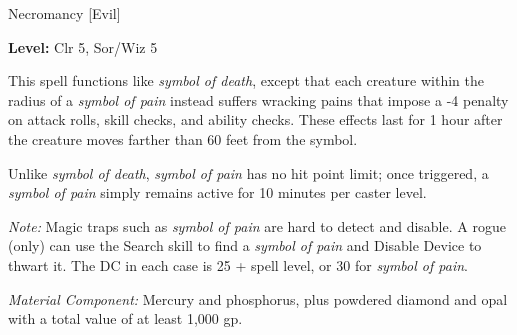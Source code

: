 
Necromancy [Evil]

\textbf{Level:} Clr 5, Sor/Wiz 5

This spell functions like \textit{symbol of death}, except that each creature within 
the radius of a \textit{symbol of pain} instead suffers wracking pains that impose 
a -4 penalty on attack rolls, skill checks, and ability checks. These effects last 
for 1 hour after the creature moves farther than 60 feet from the symbol.

Unlike \textit{symbol of death}, \textit{symbol of pain} has no hit point limit; 
once triggered, a \textit{symbol of pain} simply remains active for 10 minutes 
per caster level.

\textit{Note:} Magic traps such as \textit{symbol of pain} are hard to detect and 
disable. A rogue (only) can use the Search skill to find a \textit{symbol of pain 
}and Disable Device to thwart it. The DC in each case is 25 + spell level, or 30 
for \textit{symbol of pain}.

\textit{Material Component:} Mercury and phosphorus, plus powdered diamond and 
opal with a total value of at least 1,000 gp.

